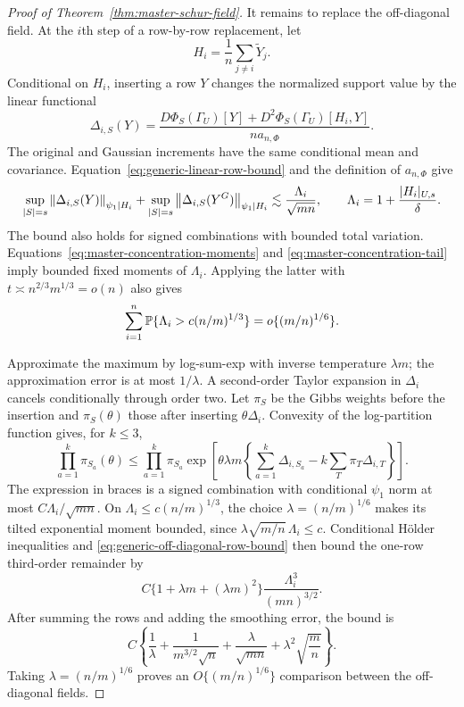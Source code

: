 \begin{proof}[Proof of Theorem~\ref{thm:master-schur-field}]
It remains to replace the off-diagonal field.  At the $i$th step of a
row-by-row replacement, let
\[
        H_i=\frac1n\sum_{j\ne i}\widetilde Y_j.
\]
Conditional on $H_i$, inserting a row $Y$ changes the normalized
support value by the linear functional
\[
        \Delta_{i,S}(Y)
        =\frac{D\Phi_S(\Gamma_U)[Y]
        +D^2\Phi_S(\Gamma_U)[H_i,Y]}{na_{n,\Phi}}.
\]
The original and Gaussian increments have the same conditional mean and
covariance.  Equation~\eqref{eq:generic-linear-row-bound} and the
definition of $a_{n,\Phi}$ give
\begin{equation}\label{eq:generic-off-diagonal-row-bound}
        \sup_{|S|=s}\left\lVert \Delta_{i,S}(Y)\right\rVert_{\psi_1\mid H_i}
        +\sup_{|S|=s}\left\lVert \Delta_{i,S}(Y^G)\right\rVert_{\psi_1\mid H_i}
        \lesssim\frac{\Lambda_i}{\sqrt{mn}},
        \qquad
        \Lambda_i=1+\frac{|H_i|_{U,s}}{\delta}.
\end{equation}
The bound also holds for signed combinations with bounded total
variation.  Equations~\eqref{eq:master-concentration-moments} and
\eqref{eq:master-concentration-tail} imply bounded fixed moments of
$\Lambda_i$.  Applying the latter with
$t\asymp n^{2/3}m^{1/3}=o(n)$ also gives
\[
        \sum_{i=1}^n\mathbb P\{\Lambda_i>c(n/m)^{1/3}\}
        =o\{(m/n)^{1/6}\}.
\]

Approximate the maximum by log-sum-exp with inverse temperature
$\lambda m$; the approximation error is at most $1/\lambda$.  A
second-order Taylor expansion in
$\Delta_i$ cancels conditionally through order two.  Let $\pi_S$ be the
Gibbs weights before the insertion and $\pi_S(\theta)$ those after
inserting $\theta\Delta_i$.  Convexity of the log-partition function gives,
for $k\le3$,
\[
 \prod_{a=1}^k\pi_{S_a}(\theta)
 \le \prod_{a=1}^k\pi_{S_a}
 \exp\!\left[\theta\lambda m\left\{
 \sum_{a=1}^k\Delta_{i,S_a}
 -k\sum_T\pi_T\Delta_{i,T}\right\}\right].
\]
The expression in braces is a signed combination with conditional
$\psi_1$ norm at most $C\Lambda_i/\sqrt{mn}$.  On
$\Lambda_i\le c(n/m)^{1/3}$, the choice
$\lambda=(n/m)^{1/6}$ makes its tilted exponential moment bounded, since
$\lambda\sqrt{m/n}\,\Lambda_i\le c$.  Conditional H\"older inequalities
and \eqref{eq:generic-off-diagonal-row-bound} then bound the one-row
third-order remainder by
\[
 C\{1+\lambda m+(\lambda m)^2\}
 \frac{\Lambda_i^3}{(mn)^{3/2}}.
\]
After summing the rows and adding the smoothing error, the bound is
\[
        C\left\{
        \frac1\lambda
        +\frac1{m^{3/2}\sqrt n}
        +\frac{\lambda}{\sqrt{mn}}
        +\lambda^2\sqrt{\frac mn}\right\}.
\]
Taking $\lambda=(n/m)^{1/6}$ proves an
$O\{(m/n)^{1/6}\}$ comparison between the off-diagonal fields.


\end{proof}
